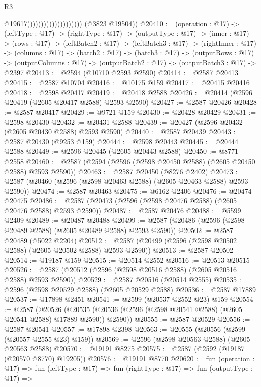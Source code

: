 \begin{lexlean}{R3}
\begin{coremodule}
                                              @19617))))))))))))))))))))
      (@3823 @19504))
@20410 := (operation : @17) ->
  (leftType : @17) ->
  (rightType : @17) ->
  (outputType : @17) ->
  (inner : @17) ->
  (rows : @17) ->
  (leftBatch2 : @17) ->
  (leftBatch3 : @17) ->
  (rightInner : @17) ->
  (columns : @17) ->
  (batch2 : @17) ->
  (batch3 : @17) ->
  (outputRows : @17) ->
  (outputColumns : @17) -> (outputBatch2 : @17) -> (outputBatch3 : @17) -> @2397
@20413 := @2594 (@10710 @2593 @2590)
@20414 := @2587 @20413
@20415 := @2587 @10704
@20416 := @10175 @159
@20417 := @20415 @20416
@20418 := @2598 @20417
@20419 := @20418 @2588
@20426 := @20414 (@2596 @20419 (@2605 @20417 @2588) @2593 @2590)
@20427 := @2587 @20426
@20428 := @2587 @20417
@20429 := @9721 @159
@20430 := @20428 @20429
@20431 := @2598 @20430
@20432 := @20431 @2588
@20439 := @20427 (@2596 @20432 (@2605 @20430 @2588) @2593 @2590)
@20440 := @2587 @20439
@20443 := @2587 @20430 (@9253 @159)
@20444 := @2598 @20443
@20445 := @20444 @2588
@20449 := @2596 @20445 (@2605 @20443 @2588)
@20450 := @8771 @2558
@20460 := @2587 (@2594 (@2596 (@2598 @20450 @2588) (@2605 @20450 @2588) @2593 @2590))
@20463 := @2587 @20450 (@8276 @2402)
@20473 := @2587 (@20460 (@2596 (@2598 @20463 @2588) (@2605 @20463 @2588) @2593 @2590))
@20474 := @2587 @20463
@20475 := @6162 @2406
@20476 := @20474 @20475
@20486 := @2587 (@20473 (@2596 (@2598 @20476 @2588) (@2605 @20476 @2588) @2593 @2590))
@20487 := @2587 @20476
@20488 := @5599 @2409
@20489 := @20487 @20488
@20499 := @2587 (@20486 (@2596 (@2598 @20489 @2588) (@2605 @20489 @2588) @2593 @2590))
@20502 := @2587 @20489 (@5022 @2204)
@20512 := @2587 (@20499 (@2596 (@2598 @20502 @2588) (@2605 @20502 @2588) @2593 @2590))
@20513 := @2587 @20502
@20514 := @19187 @159
@20515 := @20514 @2552
@20516 := @20513 @20515
@20526 := @2587 (@20512 (@2596 (@2598 @20516 @2588) (@2605 @20516 @2588) @2593 @2590))
@20529 := @2587 @20516 (@20514 @2555)
@20535 := @2596 (@2598 @20529 @2588) (@2605 @20529 @2588)
@20536 := @2587 @17889
@20537 := @17898 @2451
@20541 := @2599 (@20537 @2552 @23) @159
@20554 := @2587
    (@20526 (@20535 (@20536 (@2596 (@2598 @20541 @2588) (@2605 @20541 @2588) @17889 @2590)) @2590))
@20555 := @2587 @20529
@20556 := @2587 @20541
@20557 := @17898 @2398
@20563 := @20555 (@20556 (@2599 (@20557 @2555 @23) @159))
@20569 := @2596 (@2598 @20563 @2588) (@2605 @20563 @2588)
@20570 := @19191 @8275
@20575 := @2587 (@2592 (@19187 (@20570 @8770) @19205))
@20576 := @19191 @8770
@20620 := fun (operation : @17) =>
  fun (leftType : @17) =>
  fun (rightType : @17) =>
  fun (outputType : @17) =>

\end{coremodule}
\end{lexlean}
